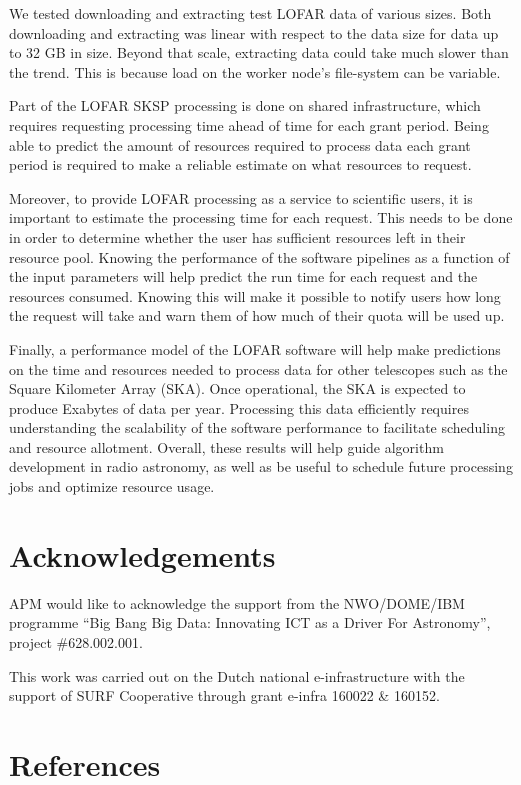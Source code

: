 \documentclass[preprint,5p]{elsarticle}
\begin{document}
We tested downloading and extracting test LOFAR data of various sizes. Both downloading and extracting was linear with respect to the data size for data up to 32 GB in size. Beyond that scale, extracting data could take much slower than the trend. This is because load on the worker node's file-system can be variable.


Part of the LOFAR SKSP processing is done on shared infrastructure, which requires requesting processing time ahead of time for each grant period. Being able to predict the amount of resources required to process data each grant period is required to make a reliable estimate on what resources to request.

Moreover, to provide LOFAR processing as a service to scientific users, it is important to estimate the processing time for each request. This needs to be done in order to determine whether the user has sufficient resources left in their resource pool. Knowing the performance of the software pipelines as a function of the input parameters will help predict the run time for each request and the resources consumed. Knowing this will make it possible to notify users how long the request will take and warn them of how much of their quota will be used up. 

Finally, a performance model of the LOFAR software will help make predictions on the time and resources needed to process data for other telescopes such as the Square Kilometer Array (SKA). Once operational, the SKA is expected to produce Exabytes of data per year. Processing this data efficiently requires understanding the scalability of the software performance to facilitate scheduling and resource allotment. Overall, these results will help guide algorithm development in radio astronomy, as well as be useful to schedule future processing jobs and optimize resource usage. 




\section*{Acknowledgements}
APM would like to acknowledge the support from the NWO/DOME/IBM programme ``Big Bang Big Data: Innovating ICT as a Driver For Astronomy'', project \#628.002.001.



This work was carried out on the Dutch national e-infrastructure with the support of SURF
Cooperative through grant e-infra 160022 \& 160152.

\section*{References}

\end{document}
